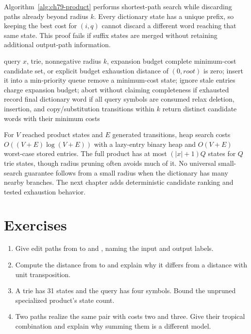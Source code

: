 Algorithm~\ref{alg:ch79-product} performs shortest-path search while discarding paths already beyond radius $k$.
Every dictionary state has a unique prefix, so keeping the best cost for $(i,q)$ cannot discard a different word reaching that same state.
This proof fails if suffix states are merged without retaining additional output-path information.

\begin{algorithm}[htbp]
\caption{Enumerate dictionary candidates through an implicit unit-edit FST product.}
\label{alg:ch79-product}
\begin{pseudocode}
\Require query $x$, trie, nonnegative radius $k$, expansion budget
\Ensure complete minimum-cost candidate set, or explicit budget exhaustion
\State distance of $(0,root)$ is zero; insert it into a min-priority queue
\State remove a minimum-cost state; ignore stale entries
\State charge expansion budget; abort without claiming completeness if exhausted
\State record final dictionary word if all query symbols are consumed
\State relax deletion, insertion, and copy/substitution transitions within $k$
\EndWhile
\State return distinct candidate words with their minimum costs
\end{pseudocode}
\end{algorithm}

For $V$ reached product states and $E$ generated transitions, heap search costs $O((V+E)\log(V+E))$ with a lazy-entry binary heap and $O(V+E)$ worst-case stored entries.
The full product has at most $(|x|+1)Q$ states for $Q$ trie states, though radius pruning often avoids much of it.
No universal small-search guarantee follows from a small radius when the dictionary has many nearby branches.
The next chapter adds deterministic candidate ranking and tested exhaustion behavior.

\section{Exercises}
\label{sec:ch79-exercises}
\begin{enumerate}
\item\label{ex:ch79-edits} Give edit paths from  to  and , naming the input and output labels.
\item\label{ex:ch79-transpose} Compute the distance from  to  and explain why it differs from a distance with unit transposition.
\item\label{ex:ch79-product} A trie has 31 states and the query has four symbols.
Bound the unpruned specialized product's state count.
\item\label{ex:ch79-semiring} Two paths realize the same pair with costs two and three.
Give their tropical combination and explain why summing them is a different model.
\end{enumerate}

